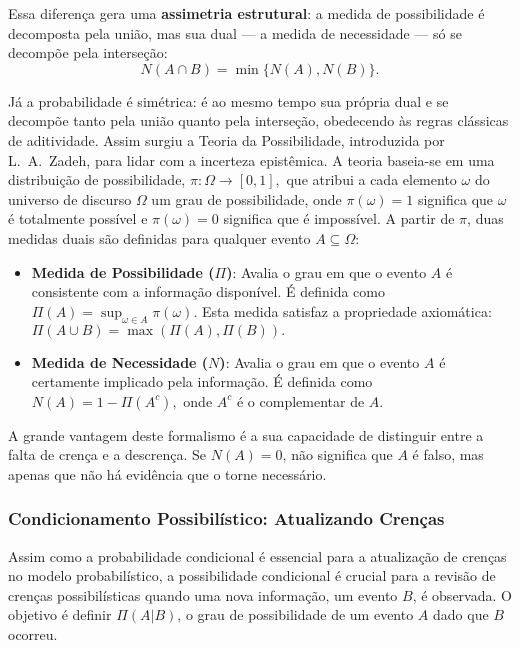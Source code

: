 \documentclass[a4paper]{article}
\begin{document}
\begin{answer}[Questão 01]
Essa diferença gera uma \textbf{assimetria estrutural}: a medida de possibilidade é decomposta pela união, mas sua dual --- a medida de necessidade --- só se decompõe pela interseção:
\[
    N(A \cap B) = \min\{N(A), N(B)\}.
\]

Já a probabilidade é simétrica: é ao mesmo tempo sua própria dual e se decompõe tanto pela união quanto pela interseção, obedecendo às regras clássicas de aditividade.
Assim surgiu a Teoria da Possibilidade, introduzida por L.~A.~Zadeh, para lidar com a incerteza epistêmica. A teoria baseia-se em uma distribuição de possibilidade, 
\(
\pi : \Omega \to [0,1],
\)
que atribui a cada elemento $\omega$ do universo de discurso $\Omega$ um grau de possibilidade, onde $\pi(\omega) = 1$ significa que $\omega$ é totalmente possível e $\pi(\omega) = 0$ significa que é impossível. A partir de $\pi$, duas medidas duais são definidas para qualquer evento $A \subseteq \Omega$:

\begin{itemize}
  \item \textbf{Medida de Possibilidade ($\Pi$)}: Avalia o grau em que o evento $A$ é consistente com a informação disponível. É definida como
  \(
  \Pi(A) = \sup_{\omega \in A} \pi(\omega).
  \)
  Esta medida satisfaz a propriedade axiomática:
  \(
  \Pi(A \cup B) = \max(\Pi(A), \Pi(B)).
  \)

  \item \textbf{Medida de Necessidade ($N$)}: Avalia o grau em que o evento $A$ é certamente implicado pela informação. É definida como
  \(
  N(A) = 1 - \Pi(A^c),
  \)
  onde $A^c$ é o complementar de $A$.
\end{itemize}


A grande vantagem deste formalismo é a sua capacidade de distinguir entre a falta de crença e a descrença. Se $N(A)=0$, não significa que $A$ é falso, mas apenas que não há evidência que o torne necessário.




\subsubsection*{Condicionamento Possibilístico: Atualizando Crenças}

Assim como a probabilidade condicional é essencial para a atualização de crenças no modelo probabilístico, a possibilidade condicional é crucial para a revisão de crenças possibilísticas quando uma nova informação, um evento $B$, é observada. O objetivo é definir $\Pi(A|B)$, o grau de possibilidade de um evento $A$ dado que $B$ ocorreu.


\end{answer}
\end{document}
